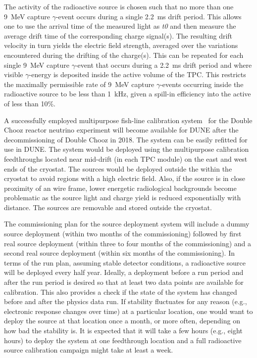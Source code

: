 
The activity of the radioactive source is chosen such that no more than one \SI{9}{\MeV} capture $\gamma$-event occurs during a single \SI{2.2}{\milli\s} drift period. This allows one to use the arrival time of the measured light as {\it t0} and then measure the average drift time of the corresponding charge signal(s). The resulting drift velocity in turn yields the electric field strength, averaged over the variations encountered during the drifting of the charge(s). This can be repeated for each single \SI{9}{\MeV} capture $\gamma$-event that occurs during a \SI{2.2}{\milli\s} drift period and where visible $\gamma$-energy is deposited inside the active volume of the TPC. This restricts the maximally permissible rate of \SI{9}{\MeV} capture $\gamma$-events occurring inside the radioactive source to be less
than \SI{1}{\kilo\hertz}, given a spill-in efficiency into the active  of
less than \num{10}\%.

A successfully employed multipurpose fish-line calibration system~\cite{}  for the Double Chooz reactor neutrino experiment will become available for DUNE after the decommissioning of Double Chooz in 2018. The system can be easily refitted for use in DUNE. The system would be deployed using the multipurpose calibration feedthroughs located near mid-drift (in each TPC module) on the east and west ends of the cryostat.
The sources would be deployed outside the  within the cryostat to avoid regions with a high electric field. Also, if the source is in close proximity of an  wire frame, lower energetic radiological backgrounds become problematic as the source light and charge yield is reduced exponentially with distance. The sources are removable and stored outside the cryostat.

The commissioning plan for the source deployment system will include a dummy 
source deployment (within two months of the commissioning) followed by first real source deployment (within three to four months of the commissioning) and a second real source deployment (within six months of the commissioning). In terms of the run plan, assuming stable detector conditions, a radioactive source will be deployed every half year. Ideally, a deployment before a run period and after the run period is desired so that at least two data points are available for calibration. This also provides a check if the state of the system has changed before and after the physics data run. If stability fluctuates for any reason (e.g., electronic response changes over time) at a particular location, one would want to deploy the source at that location once a month, or more often, depending on how bad the stability is. It is expected that it will take a few hours (e.g., eight hours) to deploy the system at one feedthrough location and a full radioactive source calibration campaign might take at least a week.

